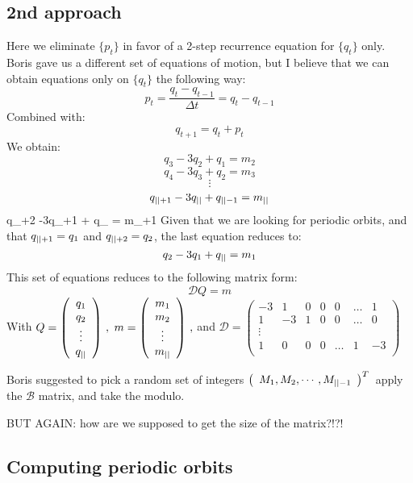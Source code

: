 \subsection{2nd approach}
\label{sect:cat2AKS}

Here we eliminate $\{p_t\}$ in favor of a 2-step recurrence equation
for $\{q_t\}$ only.
Boris gave us a different set of equations of motion, but I believe that
we can obtain equations only on $\{q_t\}$ the following way:
\[
p_t = \frac{q_t - q_{t-1}}{\Delta t} = q_t - q_{t-1}
\]
Combined with:
\[
q_{t+1} = q_t + p_t
\]
We obtain:
\[
q_3 - 3q_2 + q_1 = m_2
\]
\[
q_4 - 3q_3 + q_2 = m_3
\]
\[\vdots\]
\[
q_{{||}+1} -3q_{||} + q_{{||}-1} = m_{||}
\]
\beq
q_{\cl{}+2} -3q_{\cl{}+1} + q_\cl{} = m_{\cl{}+1}
Given that we are looking for periodic orbits, and that
$q_{{||}+1} = q_1$ and $q_{{||}+2} = q_2$,
the last equation reduces to:
\[
q_2 - 3q_1 + q_{||} = m_1
\]
This set of equations reduces to the following matrix form:
\[
\mathcal{D}Q  =  m
\]
With
$Q = \left (
\begin{array}{c}
q_1\\
q_2\\
\vdots \\
q_{||}
\end{array}
\right ) \,,$
$m =  \left (
\begin{array}{c}
m_1\\
m_2\\
\vdots \\
m_{||}
\end{array}
\right ) \,,$ and
$
\mathcal{D} =  \left (
\begin{array}{ccccccc}
-3 & 1 & 0 & 0 & 0 & \dots & 1 \\
1 & -3 & 1 & 0 & 0 & \dots & 0 \\
\vdots & & & & & & \\
1 & 0 & 0 & 0 & \dots & 1 & -3 \\
\end{array}
\right )
$

Boris suggested to pick a random set of integers
$ \left (
\begin{array}{c}
M_1,
M_2,
\cdots ,
M_{{||}-1}
\end{array}
\right )^T \,$
apply the $\mathcal{B}$ matrix, and take the modulo.

BUT AGAIN: how are we supposed to get the size of the matrix?!?!

\subsection{Computing periodic orbits}


